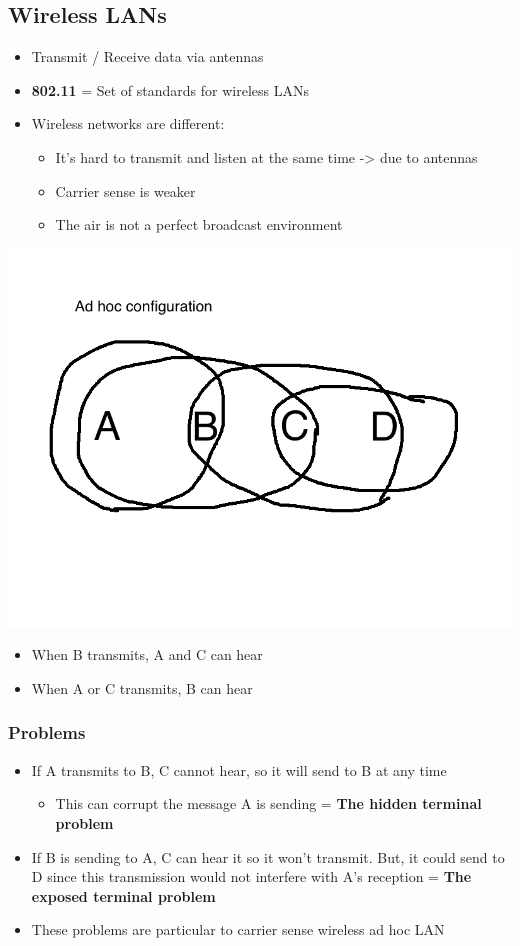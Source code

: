 \documentclass[11pt]{article}
\begin{document}
\subsection{Wireless LANs}
\label{sec:orgheadline51}
\begin{itemize}
\item Transmit / Receive data via antennas
\item \textbf{802.11} = Set of standards for wireless LANs
\item Wireless networks are different:
\begin{itemize}
\item It's hard to transmit and listen at the same time -> due to
antennas
\item Carrier sense is weaker
\item The air is not a perfect broadcast environment
\end{itemize}
\end{itemize}
\includegraphics[width=.9\linewidth]{diagrams/adhocconfig.png}
\begin{itemize}
\item When B transmits, A and C can hear
\item When A or C transmits, B can hear
\end{itemize}

\subsubsection{Problems}
\label{sec:orgheadline47}
\begin{itemize}
\item If A transmits to B, C cannot hear, so it will send to B at any time
\begin{itemize}
\item This can corrupt the message A is sending = \textbf{The hidden terminal
problem}
\end{itemize}
\item If B is sending to A, C can hear it so it won't transmit. But, it
could send to D since this transmission would not interfere with A's
reception = \textbf{The exposed terminal problem}
\item These problems are particular to carrier sense wireless ad hoc LAN
\end{itemize}
\end{document}
